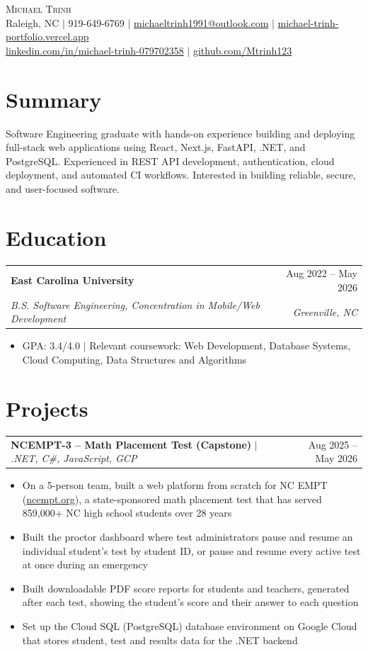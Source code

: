 \documentclass[letterpaper,11pt]{article}
\makeatletter
\newcommand{\entry}[4]{%
  \begin{tabularx}{\textwidth}{@{}X r@{}}
    \textbf{#1} & #2 \\
    \textit{#3} & \textit{#4} \\
  \end{tabularx}\vspace{-2pt}}
\newcommand{\project}[3]{%
  \begin{tabularx}{\textwidth}{@{}X r@{}}
    \textbf{#1} $|$ \textit{#2} & #3 \\
  \end{tabularx}\vspace{-2pt}}
\makeatother
\begin{document}
\begin{center}
  {\Huge\scshape Michael Trinh} \\[4pt]
  \small
  Raleigh, NC $|$ 919-649-6769 $|$
  \href{mailto:michaeltrinh1991@outlook.com}{michaeltrinh1991@outlook.com} $|$
  \href{https://michael-trinh-portfolio.vercel.app/}{michael-trinh-portfolio.vercel.app} \\
  \href{https://linkedin.com/in/michael-trinh-079702358/}{linkedin.com/in/michael-trinh-079702358} $|$
  \href{https://github.com/Mtrinh123}{github.com/Mtrinh123}
\end{center}

\section{Summary}
Software Engineering graduate with hands-on experience building and deploying full-stack web applications using React, Next.js, FastAPI, .NET, and PostgreSQL. Experienced in REST API development, authentication, cloud deployment, and automated CI workflows. Interested in building reliable, secure, and user-focused software.

\section{Education}
\entry{East Carolina University}{Aug 2022 -- May 2026}
      {B.S. Software Engineering, Concentration in Mobile/Web Development}{Greenville, NC}
\begin{itemize}
  \item GPA: 3.4/4.0 $|$ Relevant coursework: Web Development, Database Systems, Cloud Computing, Data Structures and Algorithms
\end{itemize}

\section{Projects}
\project{NCEMPT-3 -- Math Placement Test (Capstone)}{.NET, C\#, JavaScript, GCP}{Aug 2025 -- May 2026}
\begin{itemize}
  \item On a 5-person team, built a web platform from scratch for NC EMPT (\href{https://ncempt.org}{ncempt.org}), a state-sponsored math placement test that has served 859,000+ NC high school students over 28 years
  \item Built the proctor dashboard where test administrators pause and resume an individual student's test by student ID, or pause and resume every active test at once during an emergency
  \item Built downloadable PDF score reports for students and teachers, generated after each test, showing the student's score and their answer to each question
  \item Set up the Cloud SQL (PostgreSQL) database environment on Google Cloud that stores student, test and results data for the .NET backend
\end{itemize}
\vspace{4pt}
\end{document}
